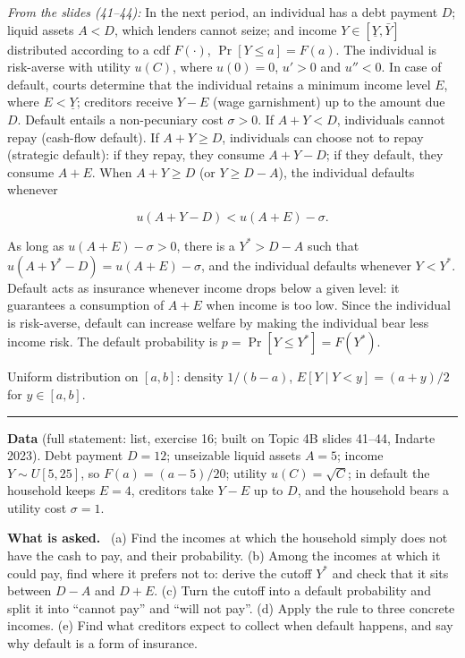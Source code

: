 \documentclass[11pt,a4paper]{article}
\newcommand{\asked}{\par\medskip\noindent\textbf{What is asked.}~}
\newcommand{\stmtend}{\par\endgroup\nopagebreak\noindent\rule{\linewidth}{0.4pt}\par\medskip}
\begin{document}
\emph{From the slides (41--44):} In the next period, an individual has a debt payment \(D\); liquid
assets \(A < D\), which lenders cannot seize; and income \(Y \in [\underline Y, \bar Y]\)
distributed according to a cdf \(F(\cdot)\), \(\Pr[Y \le a] = F(a)\). The individual is risk-averse
with utility \(u(C)\), where \(u(0) = 0\), \(u' > 0\) and \(u'' < 0\). In case of default, courts
determine that the individual retains a minimum income level \(E\), where \(E < \underline Y\);
creditors receive \(Y - E\) (wage garnishment) up to the amount due \(D\). Default entails a
non-pecuniary cost \(\sigma > 0\). If \(A + Y < D\), individuals cannot repay (cash-flow default).
If \(A + Y \ge D\), individuals can choose not to repay (strategic default): if they repay, they
consume \(A + Y - D\); if they default, they consume \(A + E\). When \(A + Y \ge D\) (or
\(Y \ge D - A\)), the individual defaults whenever

\[u(A + Y - D) < u(A + E) - \sigma.\]

As long as \(u(A + E) - \sigma > 0\), there is a \(Y^* > D - A\) such that
\(u(A + Y^* - D) = u(A + E) - \sigma\), and the individual defaults whenever \(Y < Y^*\). Default
acts as insurance whenever income drops below a given level: it guarantees a consumption of
\(A + E\) when income is too low. Since the individual is risk-averse, default can increase welfare
by making the individual bear less income risk. The default probability is
\(p = \Pr[Y \le Y^*] = F(Y^*)\).

Uniform distribution on \([a, b]\): density \(1/(b - a)\), \(E[Y \mid Y < y] = (a + y)/2\) for
\(y \in [a, b]\).
\stmtend

\noindent\textbf{Data} (full statement: list, exercise 16; built on Topic 4B slides 41--44, Indarte 2023).
Debt payment $D=12$; unseizable liquid assets $A=5$; income $Y\sim U[5,25]$, so $F(a)=(a-5)/20$;
utility $u(C)=\sqrt C$; in default the household keeps $E=4$, creditors take $Y-E$ up to $D$, and the
household bears a utility cost $\sigma=1$.

\asked
(a) Find the incomes at which the household simply does not have the cash to pay, and their probability.
(b) Among the incomes at which it could pay, find where it prefers not to: derive the cutoff $Y^*$ and check
that it sits between $D-A$ and $D+E$.
(c) Turn the cutoff into a default probability and split it into ``cannot pay'' and ``will not pay''.
(d) Apply the rule to three concrete incomes.
(e) Find what creditors expect to collect when default happens, and say why default is a form of insurance.
\end{document}
